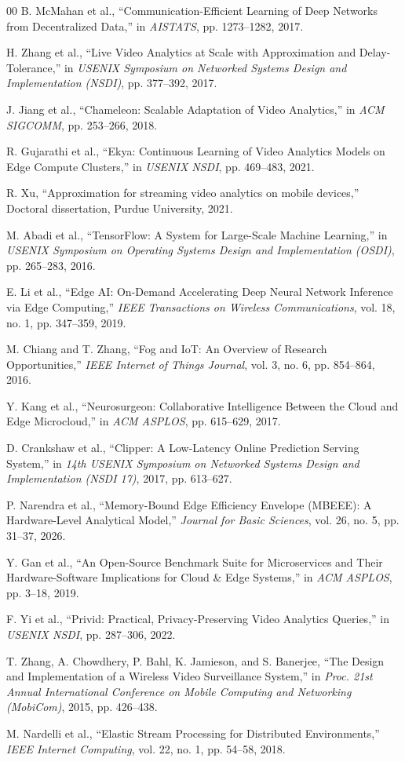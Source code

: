 \documentclass[conference]{IEEEtran}
\begin{document}
\begin{thebibliography}{00}
 B. McMahan et al., ``Communication-Efficient Learning of Deep Networks from Decentralized Data,'' in \textit{AISTATS}, pp. 1273--1282, 2017.

 H. Zhang et al., ``Live Video Analytics at Scale with Approximation and Delay-Tolerance,'' in \textit{USENIX Symposium on Networked Systems Design and Implementation (NSDI)}, pp. 377--392, 2017.

 J. Jiang et al., ``Chameleon: Scalable Adaptation of Video Analytics,'' in \textit{ACM SIGCOMM}, pp. 253--266, 2018.

 R. Gujarathi et al., ``Ekya: Continuous Learning of Video Analytics Models on Edge Compute Clusters,'' in \textit{USENIX NSDI}, pp. 469--483, 2021.

 R. Xu, ``Approximation for streaming video analytics on mobile devices,'' Doctoral dissertation, Purdue University, 2021.

 M. Abadi et al., ``TensorFlow: A System for Large-Scale Machine Learning,'' in \textit{USENIX Symposium on Operating Systems Design and Implementation (OSDI)}, pp. 265--283, 2016.

 E. Li et al., ``Edge AI: On-Demand Accelerating Deep Neural Network Inference via Edge Computing,'' \textit{IEEE Transactions on Wireless Communications}, vol. 18, no. 1, pp. 347--359, 2019.

 M. Chiang and T. Zhang, ``Fog and IoT: An Overview of Research Opportunities,'' \textit{IEEE Internet of Things Journal}, vol. 3, no. 6, pp. 854--864, 2016.

 Y. Kang et al., ``Neurosurgeon: Collaborative Intelligence Between the Cloud and Edge Microcloud,'' in \textit{ACM ASPLOS}, pp. 615--629, 2017.

 D. Crankshaw et al., ``Clipper: A Low-Latency Online Prediction Serving System,'' in \textit{14th USENIX Symposium on Networked Systems Design and Implementation (NSDI 17)}, 2017, pp. 613--627.

 P. Narendra et al., ``Memory-Bound Edge Efficiency Envelope (MBEEE): A Hardware-Level Analytical Model,'' \textit{Journal for Basic Sciences}, vol. 26, no. 5, pp. 31--37, 2026.

 Y. Gan et al., ``An Open-Source Benchmark Suite for Microservices and Their Hardware-Software Implications for Cloud \& Edge Systems,'' in \textit{ACM ASPLOS}, pp. 3--18, 2019.

 F. Yi et al., ``Privid: Practical, Privacy-Preserving Video Analytics Queries,'' in \textit{USENIX NSDI}, pp. 287--306, 2022.

 T. Zhang, A. Chowdhery, P. Bahl, K. Jamieson, and S. Banerjee, ``The Design and Implementation of a Wireless Video Surveillance System,'' in \textit{Proc. 21st Annual International Conference on Mobile Computing and Networking (MobiCom)}, 2015, pp. 426--438.

 M. Nardelli et al., ``Elastic Stream Processing for Distributed Environments,'' \textit{IEEE Internet Computing}, vol. 22, no. 1, pp. 54--58, 2018.

\end{thebibliography}
\end{document}
